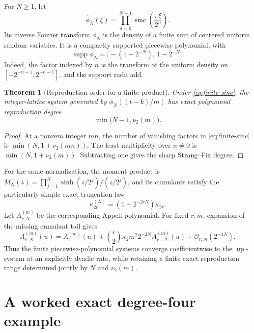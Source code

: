 \documentclass[11pt,oneside]{article}
\newtheorem{theorem}{Theorem}[section]
\theoremstyle{definition}
\theoremstyle{remark}
\newcommand{\Up}{\operatorname{up}}
\newcommand{\sinc}{\operatorname{sinc}}
\newcommand{\supp}{\operatorname{supp}}
\newcommand{\vtwo}{\nu_2}
\newcommand{\bigO}{\mathcal O}
\begin{document}
For \(N\ge1\), let
\begin{equation}
 \widehat\phi_N(\xi)=
 \prod_{n=0}^{N-1}\sinc\!\left(\frac{\pi\xi}{2^n}\right).
 \label{eq:finite-sinc}
\end{equation}
Its inverse Fourier transform \(\phi_N\) is the density of a finite sum of
centered uniform random variables.  It is a compactly supported piecewise
polynomial, with
\[
 \supp\phi_N=\bigl[-(1-2^{-N}),\,1-2^{-N}\bigr].
\]
Indeed, the factor indexed by \(n\) is the transform of the uniform density on
\([-2^{-n-1},2^{-n-1}]\), and the support radii add.

\begin{theorem}[Reproduction order for a finite product]
\label{thm:finite-product-order}
Under \eqref{eq:finite-sinc}, the integer-lattice system generated by
\(\phi_N((t-k)/m)\) has exact polynomial reproduction degree
\begin{equation}
 \min\bigl(N-1,\vtwo(m)\bigr).
 \label{eq:finite-order}
\end{equation}
\end{theorem}

\begin{proof}
At a nonzero integer \(mn\), the number of vanishing factors in
\eqref{eq:finite-sinc} is
\(\min(N,1+\vtwo(mn))\).  The least multiplicity over \(n\ne0\) is
\(\min(N,1+\vtwo(m))\).  Subtracting one gives the sharp Strang--Fix degree.
\end{proof}

For the same normalization, the moment product is
\(M_N(z)=\prod_{j=1}^{N}\sinh(z/2^j)/(z/2^j)\), and its cumulants satisfy the
particularly simple exact truncation law
\begin{equation}
 \kappa_{2r}^{(N)}=(1-2^{-2rN})\kappa_{2r}.
 \label{eq:finite-cumulants}
\end{equation}
Let \(A_{r,N}^{(m)}\) be the corresponding Appell polynomial.  For fixed
\(r,m\), expansion of the missing cumulant tail gives
\begin{equation}
 A_{r,N}^{(m)}(u)=A_r^{(m)}(u)
 +\binom r2\kappa_2m^2 2^{-2N}A_{r-2}^{(m)}(u)
 +\bigO_{r,m}(2^{-4N}).
 \label{eq:finite-appell-convergence}
\end{equation}
Thus the finite piecewise-polynomial systems converge coefficientwise to the
\(\Up\)-system at an explicitly dyadic rate, while retaining a finite exact
reproduction range determined jointly by \(N\) and \(\vtwo(m)\).


\section{A worked exact degree-four example}
\label{sec:example}
\end{document}
